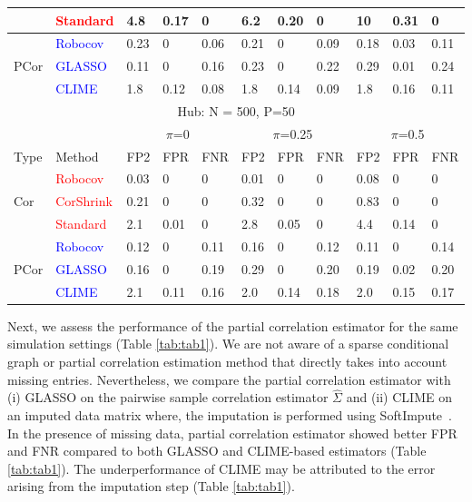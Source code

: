 \begin{table}[h]
\begin{tabular}[!t]{|p{0.5cm}|p{1.1cm}|p{0.4cm}|p{0.45cm}|p{0.45cm}|p{0.4cm}|p{0.45cm}|p{0.45cm}|p{0.4cm}|p{0.45cm}|p{0.45cm}|}
& \textcolor{red}{Standard} & 4.8 & 0.17 &   0 & 6.2 & 0.20 &  0 &  10 & 0.31 &  0 \\ \hline 
\multirow{ 3}{*}{PCor} & \textcolor{blue}{Robocov} & 0.23 & 0 & 0.06 & 0.21 & 0 & 0.09 & 0.18 & 0.03 & 0.11 \\
& \textcolor{blue}{GLASSO} & 0.11 & 0 & 0.16 & 0.23 & 0 & 0.22 & 0.29 & 0.01 & 0.24 \\
& \textcolor{blue}{CLIME}  & 1.8 & 0.12 & 0.08 & 1.8 & 0.14 & 0.09  & 1.8 & 0.16 & 0.11 \\ \hline 
\multicolumn{11}{|c|}{Hub: N = 500, P=50} \\ \hline
& & \multicolumn{3}{c|}{$\pi$=0} & \multicolumn{3}{c|}{$\pi$=0.25} & \multicolumn{3}{c|}{$\pi$=0.5} \\ \hline
Type & Method & FP2 & FPR & FNR &  FP2 & FPR & FNR & FP2 & FPR & FNR \\ \hline
\multirow{ 3}{*}{Cor} & \textcolor{red}{Robocov}  & 0.03 &   0 &   0 & 0.01 &   0 &   0 & 0.08 &   0 &   0  \\
& \textcolor{red}{CorShrink} & 0.21 &   0 &   0 & 0.32 &   0 &   0 & 0.83 &   0 &   0\\
& \textcolor{red}{Standard} & 2.1 & 0.01 &   0 & 2.8 & 0.05 &   0 & 4.4 & 0.14 &   0 \\ \hline 
\multirow{ 3}{*}{PCor} & \textcolor{blue}{Robocov} & 0.12 & 0 & 0.11 & 0.16 & 0 & 0.12 & 0.11 & 0 & 0.14 \\
& \textcolor{blue}{GLASSO} & 0.16 & 0 & 0.19 & 0.29 & 0 & 0.20 & 0.19 & 0.02 & 0.20 \\
& \textcolor{blue}{CLIME} & 2.1 & 0.11 & 0.16 & 2.0 & 0.14 & 0.18 & 2.0 & 0.15 & 0.17 \\ \hline
\end{tabular}
\end{table}
 
\normalsize
Next, we assess the performance of the \Robocov{} partial correlation estimator for the same simulation settings (Table \ref{tab:tab1}). We are not aware of a sparse conditional graph or partial correlation estimation method that directly takes into account missing entries. Nevertheless, we compare the \Robocov{} partial correlation estimator with (i) GLASSO on the pairwise sample correlation estimator $\hat{\Sigma}$ and (ii) CLIME on an imputed data matrix where, the imputation is performed using SoftImpute~\cite{mazumder2015}. In the presence of missing data, \Robocov{} partial correlation estimator showed better FPR and FNR compared to both GLASSO and CLIME-based estimators (Table \ref{tab:tab1}). The underperformance of CLIME may be attributed to the error arising from the imputation step (Table \ref{tab:tab1}).


